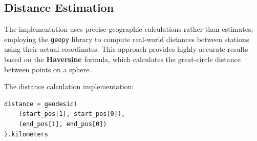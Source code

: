 \documentclass{article}
\begin{document}
\subsection{Distance Estimation}

The implementation uses precise geographic calculations rather than estimates, employing the \texttt{geopy} library to compute real-world distances between stations using their actual coordinates. This approach provides highly accurate results based on the \textbf{Haversine} formula, which calculates the great-circle distance between points on a sphere.

The distance calculation implementation:

\begin{lstlisting}[style=PythonStyle, caption={Distance Calculation Using Geodesic}]
distance = geodesic(
    (start_pos[1], start_pos[0]),
    (end_pos[1], end_pos[0])
).kilometers
\end{lstlisting}
\end{document}

